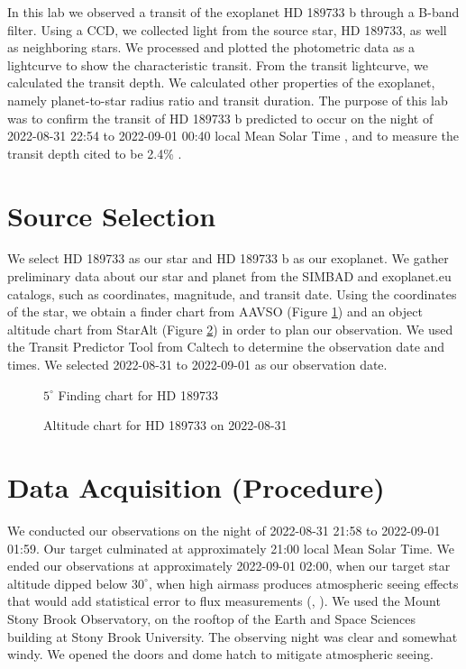 \documentclass[twocolumn]{aastex631}
\begin{document}
In this lab we observed a transit of the exoplanet HD 189733 b through a B-band filter. Using a CCD, we collected light from the source star, HD 189733, as well as neighboring stars. We processed and plotted the photometric data as a lightcurve to show the characteristic transit. From the transit lightcurve, we calculated the transit depth. We calculated other properties of the exoplanet, namely planet-to-star radius ratio and transit duration. The purpose of this lab was to confirm the transit of HD 189733 b predicted to occur on the night of 2022-08-31 22:54 to 2022-09-01 00:40 local Mean Solar Time \citep{ipac_2022}, and to measure the transit depth cited to be 2.4\% \citep{Cauley_2017}.

\section{Source Selection} \label{sec:source}

We select HD 189733 as our star and HD 189733 b as our exoplanet. We gather preliminary data about our star and planet from the SIMBAD and exoplanet.eu catalogs, such as coordinates, magnitude, and transit date. Using the coordinates of the star, we obtain a finder chart from AAVSO (Figure \ref{fig:finder}) and an object altitude chart from StarAlt (Figure \ref{fig:staralt}) in order to plan our observation. We used the Transit Predictor Tool from Caltech \citep{ipac_2022} to determine the observation date and times. We selected 2022-08-31 to 2022-09-01 as our observation date.

\begin{figure}[ht!]
\caption{$5^\circ$ Finding chart for HD 189733 \label{fig:finder}}
\end{figure}

\begin{figure}[ht!]
\caption{Altitude chart for HD 189733 on 2022-08-31 \label{fig:staralt}}
\end{figure}

\pagebreak

\section{Data Acquisition (Procedure)} \label{sec:observation}

We conducted our observations on the night of 2022-08-31 21:58 to 2022-09-01 01:59. Our target culminated at approximately 21:00 local Mean Solar Time. We ended our observations at approximately 2022-09-01 02:00, when our target star altitude dipped below $30^\circ$, when high airmass produces atmospheric seeing effects that would add statistical error to flux measurements (\citet{vdl_2022_4}, \citet{vdl_2022}). We used the Mount Stony Brook Observatory, on the rooftop of the Earth and Space Sciences building at Stony Brook University. The observing night was clear and somewhat windy. We opened the doors and dome hatch to mitigate atmospheric seeing. \citep{vdl_2022_2}
\end{document}
